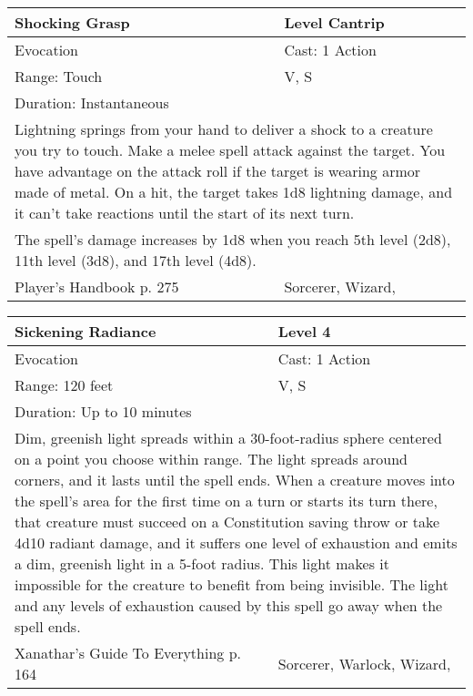 \documentclass[11pt]{report}
\begin{document}
\begin{table}[H]
	\begin{tabular}{||p{6cm}|p{6cm}||}
		\hline\hline
		\bf{Shocking Grasp} & Level Cantrip\\ \hline
		Evocation & Cast: 1 Action\\ \hline
		Range: Touch & V, S\\ \hline
		Duration: Instantaneous & \\ \hline
		\multicolumn{2}{||p{12cm}||}{Lightning springs from your hand to deliver a shock to a creature you try to touch.
Make a melee spell attack against the target. You have advantage on the attack roll if the target is wearing armor made of metal. On a hit, the target takes 1d8 lightning damage, and it can’t take reactions until the start of its next turn.}\\ \hline
		\multicolumn{2}{||p{12cm}||}{The spell’s damage increases by 1d8 when you reach 5th level (2d8), 11th level (3d8), and 17th level (4d8).}\\ \hline
Player's Handbook p. 275 & Sorcerer, Wizard, \\ \hline\hline
	\end{tabular}
\end{table}

\begin{table}[H]
	\begin{tabular}{||p{6cm}|p{6cm}||}
		\hline\hline
		\bf{Sickening Radiance} & Level 4\\ \hline
		Evocation & Cast: 1 Action\\ \hline
		Range: 120 feet & V, S\\ \hline
		Duration: Up to 10 minutes & \\ \hline
		\multicolumn{2}{||p{12cm}||}{Dim, greenish light spreads within a 30-foot-radius sphere centered on a point you choose within range. The light spreads around corners, and it lasts until the spell ends.
When a creature moves into the spell’s area for the first time on a turn or starts its turn there, that creature must succeed on a Constitution saving throw or take 4d10 radiant damage, and it suffers one level of exhaustion and emits a dim, greenish light in a 5-foot radius. This light makes it impossible for the creature to benefit from being invisible. The light and any levels of exhaustion caused by this spell go away when the spell ends.}\\ \hline
Xanathar's Guide To Everything p. 164 & Sorcerer, Warlock, Wizard, \\ \hline\hline
	\end{tabular}
\end{table}
\end{document}
